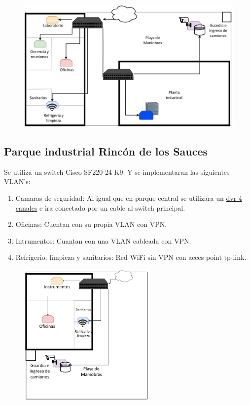 \documentclass[11pt]{article}
\begin{document}
        \begin{figure}[H]
            \centering
            \includegraphics[width=\textwidth]{Figure/Planta de parque.png}
        \end{figure}
        

    \subsection{Parque industrial Rincón de los Sauces}

    Se utiliza un switch Cisco SF220-24-K9. Y se implementaran las siguientes VLAN's: 

    \begin{enumerate}
        \item Camaras de seguridad: Al igual que en parque central se utilizara un 
        \href{https://articulo.mercadolibre.com.ar/MLA-658974667-nvr-dvr-dahua-4-canales-penta-hdcvi-xvr-1a04-5-ch-5x1-qr-ps2-_JM#position=1&type=item&tracking_id=c1ba311d-e835-4420-9ba9-f01382834064}{dvr 4 canales} e ira conectado por un cable al switch principal.
        \item Oficinas: Cuentan con su propia VLAN con VPN.
        \item Intrumentos: Cuantan con una VLAN cableada con VPN.
        \item Refrigerio, limpieza y sanitarios: Red WiFi sin VPN con acces point tp-link. 
    \end{enumerate}

    \begin{figure}[H]
        \centering
        \includegraphics[width=0.6\textwidth]{Figure/Parque Industrial.png}
    \end{figure}
\end{document}
